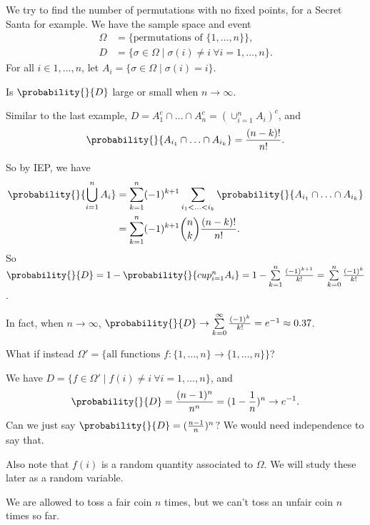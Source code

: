 \newcommand\independent{\protect\mathpalette{\protect\independenT}{\perp}}
\def\independenT#1#2{\mathrel{\rlap{$#1#2$}\mkern2mu{#1#2}}}
\begin{example}[Derangements]
    We try to find the number of permutations with no fixed points, for a Secret Santa for example.
    We have the sample space and event
    \begin{align*}
        \Omega &= \{\text{permutations of } \{1, \ldots, n\}\},\\
        D &= \{\sigma\in \Omega\mid \sigma(i) \neq i ~\forall i = 1, \ldots, n\}.
    \end{align*}
    For all \(i \in {1, \ldots, n}\), let \(A_i = \{\sigma\in \Omega\mid \sigma(i) = i\}\).
    \begin{problem}
        Is \(\probability{}{D} \) large or small when \(n \to \infty\).
    \end{problem}

    Similar to the last example, \(D = A_1^c \cap \ldots\cap A_n^c = (\cup_{i=1}^n A_i)^c\), and
    \[
        \probability{}{A_{i_1}\cap \ldots \cap A_{i_k}}=\frac{(n-k)!}{n!} .
    \]

    So by IEP, we have
    \begin{align*}
        \probability{}{\bigcup_{i=1}^n A_i} &= \sum\limits_{k=1}^{n} (-1)^{k+1} \sum\limits_{i_1 < \ldots <i_k}\probability{}{A_{i_1}\cap \ldots \cap A_{i_k}} \\
        &= \sum\limits_{k=1}^{n} (-1)^{k+1}\binom{n}{k}\frac{(n-k)!}{n!}.
    \end{align*}
    So \(\probability{}{D} = 1 - \probability{}{cup_{i=1}^n A_i}= 1 - \sum\limits_{k=1}^{n} \frac{(-1)^{k+1}}{k!} = \sum\limits_{k=0}^{n} \frac{(-1)^k}{k!}\).

    In fact, when \(n \to \infty\), \(\probability{}{D} \to \sum\limits_{k=0}^{\infty} \frac{(-1)^k}{k!}=e^{-1}\approx 0.37\).
\end{example}
\begin{note}
    What if instead \(\Omega' = \{\text{all functions } f : \{1, \ldots, n\}\to \{1, \ldots, n\}\}\)?

    We have \(D = \{f \in \Omega' \mid f(i) \neq i ~\forall i = 1, \ldots, n\}\), and
    \[
        \probability{}{D} = \frac{(n-1)^n}{n^n} = (1-\frac{1}{n})^n \to e^{-1}.
    \]
    Can we just say \(\probability{}{D}=(\frac{n-1}{n})^n\)? We would need independence to say that.

    Also note that \(f(i)\) is a random quantity associated to \(\Omega\). We will study these later as a random variable.

    We are allowed to toss a fair coin \(n\) times, but we can't toss an unfair coin \(n\) times so far.
\end{note}
